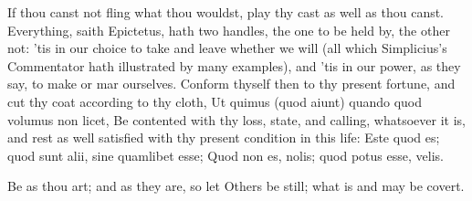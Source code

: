 {If thou canst not fling what thou wouldst, play thy cast as well as
thou canst. Everything, saith Epictetus, hath two handles, the
one to be held by, the other not: 'tis in our choice to take and leave
whether we will (all which Simplicius's Commentator hath illustrated by
many examples), and 'tis in our power, as they say, to make or mar
ourselves. Conform thyself then to thy present fortune, and cut thy
coat according to thy cloth, Ut quimus (quod aiunt) quando quod
volumus non licet, Be contented with thy loss, state, and calling,
whatsoever it is, and rest as well satisfied with thy present condition
in this life:
Este quod es; quod sunt alii, sine quamlibet esse;
Quod non es, nolis; quod potus esse, velis.

Be as thou art; and as they are, so let
Others be still; what is and may be covert.

}
